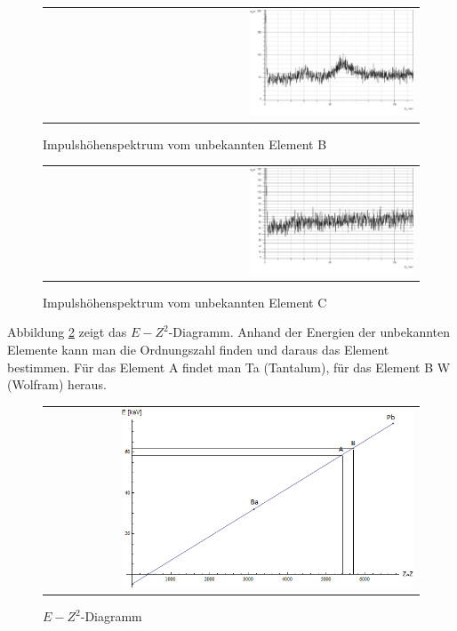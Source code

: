 \documentclass[a4paper,titlepage]{scrartcl}
\numberwithin{equation}{section}
\begin{document}
\begin{figure}[H]
		\centering
		\begin{tabular}{@{}r@{}}
			\includegraphics[width=0.45\textwidth]{bilder/aufgabe3/b.png}\\
		\end{tabular}
		\caption{Impulshöhenspektrum vom unbekannten Element B}
\end{figure}
\begin{figure}[H]
		\centering
		\begin{tabular}{@{}r@{}}
			\includegraphics[width=0.45\textwidth]{bilder/aufgabe3/c.png}\\
		\end{tabular}
		\caption{Impulshöhenspektrum vom unbekannten Element C}
		\label{fig:aufgabe3c}
\end{figure}
Abbildung \ref{fig:aufgabe3ez} zeigt das $E-Z^2$-Diagramm. Anhand der Energien der unbekannten Elemente kann man die Ordnungszahl finden und daraus das Element bestimmen. Für das Element A findet man Ta (Tantalum), für das Element B W (Wolfram) heraus.
\begin{figure}[H]
		\centering
		\begin{tabular}{@{}r@{}}
			\includegraphics[width=0.8\textwidth]{bilder/aufgabe3/ez.png}\\
		\end{tabular}
		\caption{$E-Z^2$-Diagramm}
		\label{fig:aufgabe3ez}
\end{figure}
\end{document}
